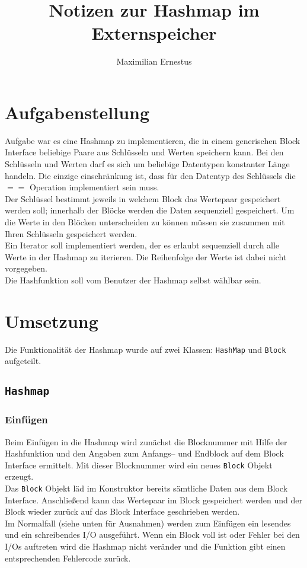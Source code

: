 \documentclass{article}
\author{Maximilian Ernestus}
\title{Notizen zur Hashmap im Externspeicher}
\begin{document}
\maketitle

\section{Aufgabenstellung}
Aufgabe war es eine Hashmap zu implementieren, die in einem generischen Block
Interface beliebige Paare aus Schlüsseln und Werten speichern kann. Bei den
Schlüsseln und Werten darf es sich um beliebige Datentypen konstanter Länge
handeln. Die einzige einschränkung ist, dass für den Datentyp des Schlüssels
die $==$ Operation implementiert sein muss.\\
Der Schlüssel bestimmt jeweils in welchem Block das Wertepaar gespeichert werden
soll; innerhalb der Blöcke werden die Daten sequenziell gespeichert. Um die
Werte in den Blöcken unterscheiden zu können müssen sie zusammen mit Ihren
Schlüsseln gespeichert werden.\\
Ein Iterator soll implementiert werden, der es erlaubt sequenziell durch alle
Werte in der Hashmap zu iterieren. Die Reihenfolge der Werte ist dabei nicht
vorgegeben.\\
Die Hashfunktion soll vom Benutzer der Hashmap selbst wählbar sein.

\section{Umsetzung}

Die Funktionalität der Hashmap wurde auf zwei Klassen: \texttt{HashMap} und
\texttt{Block} aufgeteilt.
\subsection{\texttt{Hashmap}}
\subsubsection{Einfügen}
Beim Einfügen in die Hashmap wird zunächst die Blocknummer mit Hilfe der
Hashfunktion und den Angaben zum Anfangs-- und Endblock auf dem Block Interface
ermittelt. Mit dieser Blocknummer wird ein neues \texttt{Block} Objekt
erzeugt.\\
Das \texttt{Block} Objekt läd im Konstruktor bereits sämtliche Daten aus dem
Block Interface. Anschließend kann das Wertepaar im Block gespeichert werden und
der Block wieder zurück auf das Block Interface geschrieben werden.\\
Im Normalfall (siehe unten für Ausnahmen) werden zum Einfügen ein lesendes und
ein schreibendes I/O ausgeführt. Wenn ein Block voll ist oder Fehler bei den I/Os
auftreten wird die Hashmap nicht veränder und die Funktion gibt einen
entsprechenden Fehlercode zurück.
\end{document}
